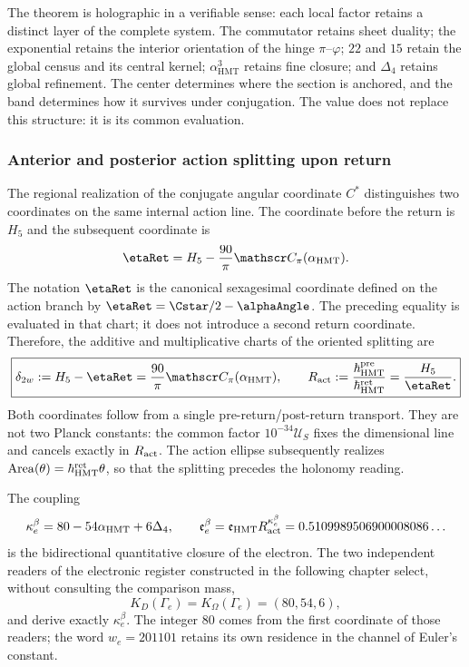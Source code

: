 The theorem is holographic in a verifiable sense: each local factor
retains a distinct layer of the complete system. The commutator retains sheet
duality; the exponential retains the interior orientation of the
hinge \(\pi\)--\(\varphi\); \(22\) and \(15\) retain the global census and
its central kernel; \(\alpha_{\mathrm{HMT}}^3\) retains fine closure; and
\(\Delta_4\) retains global refinement. The center determines where the
section is anchored, and the band determines how it survives under conjugation.
The value does not replace this structure: it is its common evaluation.

\subsubsection{Anterior and posterior action splitting upon return}
\label{sec:electron-desdoblamiento-two-way-rev9}

The regional realization of the conjugate angular coordinate \(C^*\) distinguishes two coordinates on the
same internal action line. The coordinate before the return is \(H_5\) and
the subsequent coordinate is
\[
\etaRet
 =H_5-\frac{90}{\pi}\mathscr C_\pi(\alpha_{\rm HMT}).
\]
The notation \(\etaRet\) is the canonical sexagesimal coordinate defined on the
action branch by \(\etaRet=\Cstar/2-\alphaAngle\). The preceding equality is
evaluated in that chart; it does not introduce a second return coordinate.
Therefore, the additive and multiplicative charts of the oriented splitting
are
\begin{equation}
 \boxed{
 \delta_{2w}:=H_5-\etaRet
 =\frac{90}{\pi}\mathscr C_\pi(\alpha_{\rm HMT}),
 \qquad
 R_{\rm act}:=\frac{\hbar^{\rm pre}_{\rm HMT}}
 {\hbar^{\rm ret}_{\rm HMT}}
 =\frac{H_5}{\etaRet}.}
 \label{eq:electron-desdoblamiento-two-way-rev9}
\end{equation}
Both coordinates follow from a single pre-return/post-return transport.
They are not two Planck constants: the common factor
\(10^{-34}\mathcal U_S\) fixes the dimensional line and cancels exactly in
\(R_{\rm act}\). The action ellipse subsequently realizes
\(\operatorname{Area}(\theta)=\hbar_{\rm HMT}^{\rm ret}\theta\), so that
the splitting precedes the holonomy reading.

The coupling
\begin{equation}
 \kappa_e^{\beta}
 =80-54\alpha_{\rm HMT}+6\Delta_4,
 \qquad
 \mathfrak e_e^{\beta}
 =\mathfrak e_{\rm HMT}R_{\rm act}^{\kappa_e^{\beta}}
 =0.5109989506900008086\ldots
 \label{eq:electron-beta-two-way-rev9}
\end{equation}
is the bidirectional quantitative closure of the electron. The two independent
readers of the electronic register constructed in the following chapter
select, without consulting the comparison mass,
\[
 K_D(\Gamma_e)=K_\Omega(\Gamma_e)=(80,54,6),
\]
and derive exactly \(\kappa_e^\beta\). The integer \(80\) comes from the
first coordinate of those readers; the word \(w_e=201101\) retains its
own residence in the channel of Euler's constant.

